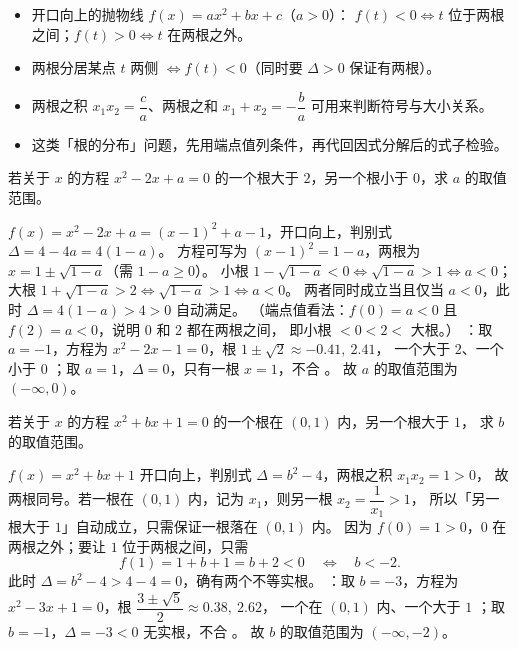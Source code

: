 \begin{explore}
\begin{itemize}
  \item 开口向上的抛物线 $f(x)=ax^2+bx+c$（$a>0$）：
        $f(t)<0\iff t$ 位于两根之间；$f(t)>0\iff t$ 在两根之外。
  \item 两根分居某点 $t$ 两侧 $\iff f(t)<0$（同时要 $\Delta>0$ 保证有两根）。
  \item 两根之积 $x_1x_2=\dfrac ca$、两根之和 $x_1+x_2=-\dfrac ba$ 可用来判断符号与大小关系。
  \item 这类「根的分布」问题，先用端点值列条件，再代回因式分解后的式子检验。
\end{itemize}

\begin{example}
若关于 $x$ 的方程 $x^2-2x+a=0$ 的一个根大于 $2$，另一个根小于 $0$，求 $a$ 的取值范围。
\end{example}
\begin{solution}
$f(x)=x^2-2x+a=(x-1)^2+a-1$，开口向上，判别式 $\Delta=4-4a=4(1-a)$。
方程可写为 $(x-1)^2=1-a$，两根为 $x=1\pm\sqrt{1-a}$（需 $1-a\geq0$）。
小根 $1-\sqrt{1-a}<0\iff\sqrt{1-a}>1\iff a<0$；
大根 $1+\sqrt{1-a}>2\iff\sqrt{1-a}>1\iff a<0$。
两者同时成立当且仅当 $a<0$，此时 $\Delta=4(1-a)>4>0$ 自动满足。
（端点值看法：$f(0)=a<0$ 且 $f(2)=a<0$，说明 $0$ 和 $2$ 都在两根之间，
即小根 $<0<2<$ 大根。）
：取 $a=-1$，方程为 $x^2-2x-1=0$，根 $1\pm\sqrt2\approx-0.41,\ 2.41$，
一个大于 $2$、一个小于 $0$ \checkmark；取 $a=1$，$\Delta=0$，只有一根 $x=1$，不合 \checkmark。
故 $a$ 的取值范围为 $(-\infty,0)$。
\end{solution}

\begin{problem}
若关于 $x$ 的方程 $x^2+bx+1=0$ 的一个根在 $(0,1)$ 内，另一个根大于 $1$，
求 $b$ 的取值范围。
\end{problem}
\begin{solution}
$f(x)=x^2+bx+1$ 开口向上，判别式 $\Delta=b^2-4$，两根之积 $x_1x_2=1>0$，
故两根同号。若一根在 $(0,1)$ 内，记为 $x_1$，则另一根 $x_2=\dfrac1{x_1}>1$，
所以「另一根大于 $1$」自动成立，只需保证一根落在 $(0,1)$ 内。
因为 $f(0)=1>0$，$0$ 在两根之外；要让 $1$ 位于两根之间，只需
\[
  f(1)=1+b+1=b+2<0\quad\Longleftrightarrow\quad b<-2.
\]
此时 $\Delta=b^2-4>4-4=0$，确有两个不等实根。
：取 $b=-3$，方程为 $x^2-3x+1=0$，根 $\dfrac{3\pm\sqrt5}{2}\approx0.38,\ 2.62$，
一个在 $(0,1)$ 内、一个大于 $1$ \checkmark；取 $b=-1$，$\Delta=-3<0$ 无实根，不合 \checkmark。
故 $b$ 的取值范围为 $(-\infty,-2)$。
\end{solution}


\end{explore}
